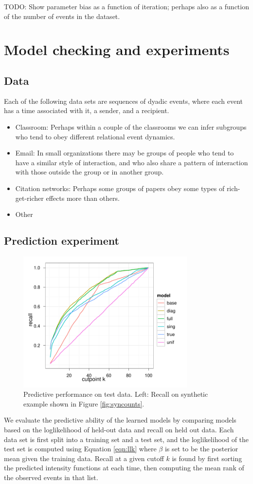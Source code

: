 \documentclass[11pt]{article}
\begin{document}
TODO: Show parameter bias as a function of iteration; perhaps also as a function of the number of events in the dataset.

\section{Model checking and experiments}

\subsection*{Data}

Each of the following data sets are sequences of dyadic events, where each event has a time associated with it, a sender, and a recipient.

\begin{itemize}
\item Classroom:  Perhaps within a couple of the classrooms we can infer subgroups who tend to obey different relational event dynamics.
\item Email: In small organizations there may be groups of people who tend to have a similar style of interaction, and who also share a pattern of interaction with those outside the group or in another group.
\item Citation networks: Perhaps some groups of papers obey some types of rich-get-richer effects more than others.
\item Other
\end{itemize}

\subsection*{Prediction experiment}
\begin{figure}
\center
\includegraphics[width=3.5in]{../figs/syn/test-recall.pdf}
\caption{Predictive performance on test data.  Left: Recall on synthetic example shown in Figure \ref{fig:syncounts}.}
\label{fig:recall}
\end{figure}
We evaluate the predictive ability of the learned models by comparing models based on the loglikelihood of held-out data and recall on held out data.  Each data set is first split into a training set and a test set, and the loglikelihood of the test set is computed using Equation \ref{eqn:llk} where $\beta$ is set to be the posterior mean given the training data.  Recall at a given cutoff $k$ is found by first sorting the predicted intensity functions at each time, then computing the mean rank of the observed events in that list.
\end{document}
